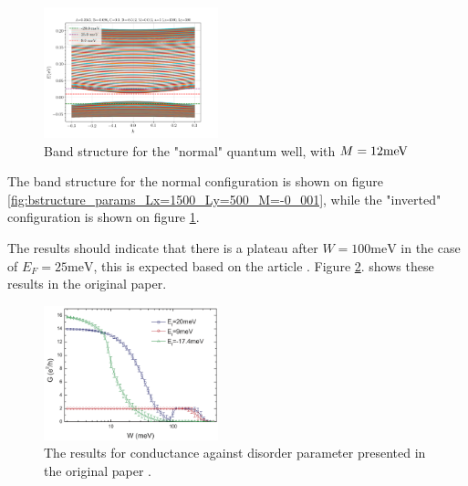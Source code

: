 \documentclass[11pt, a4paper, twocolumn]{article}
\begin{document}
\begin{figure}[H]
  \begin{center}
  \includegraphics[width=0.45\textwidth]{./media/bstructure_params_Lx=1500_Ly=500_M=0_012.png}
  \caption{Band structure for the "normal" quantum well, with $M=12\textnormal{meV}$}
  \label{fig:bstructure_params_Lx=1500_Ly=500_M=0_012}
  \end{center}
\end{figure}

The band structure for the normal configuration is shown on figure \ref{fig:bstructure_params_Lx=1500_Ly=500_M=-0_001},
while the "inverted" configuration is shown on figure \ref{fig:bstructure_params_Lx=1500_Ly=500_M=0_012}.

The results should indicate that there is a plateau after $W=100\textrm{meV}$ in the case of $E_F=25\textrm{meV}$,
this is expected based on the article \cite{andersoninsulator}.
Figure \ref{fig:tai_results_from_article}. shows these results in the original paper.
\begin{figure}[H]
  \begin{center}
  \includegraphics[width=0.45\textwidth]{./media/tai_results_from_article.png}
  \caption{The results for conductance against disorder parameter presented in the original paper \cite{andersoninsulator}.}
  \label{fig:tai_results_from_article}
  \end{center}
\end{figure}
\end{document}
